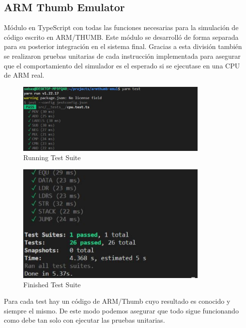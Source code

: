     \subsection{ARM Thumb Emulator}
    {
        Módulo en TypeScript con todas las funciones necesarias para la simulación de código escrito en ARM/THUMB.
        Este módulo se desarrolló de forma separada para su posterior integración en el sistema final. Gracias a esta división también se realizaron pruebas unitarias de cada instrucción implementada para asegurar que el comportamiento del simulador es el esperado si se ejecutase en una CPU de ARM real.
    
        \begin{figure}[h]
         \centering
            \includegraphics[width=0.85\textwidth]{images/tests}
            \caption{Running Test Suite}
        \end{figure}
        
        \begin{figure}[h]
         \centering
            \includegraphics[width=0.85\textwidth]{images/tests2}
            \caption{Finished Test Suite}
        \end{figure}
        
        Para cada test hay un código de ARM/Thumb cuyo resultado es conocido y siempre el mismo. De este modo podemos asegurar que todo sigue funcionando como debe tan solo con ejecutar las pruebas unitarias.
        
}
